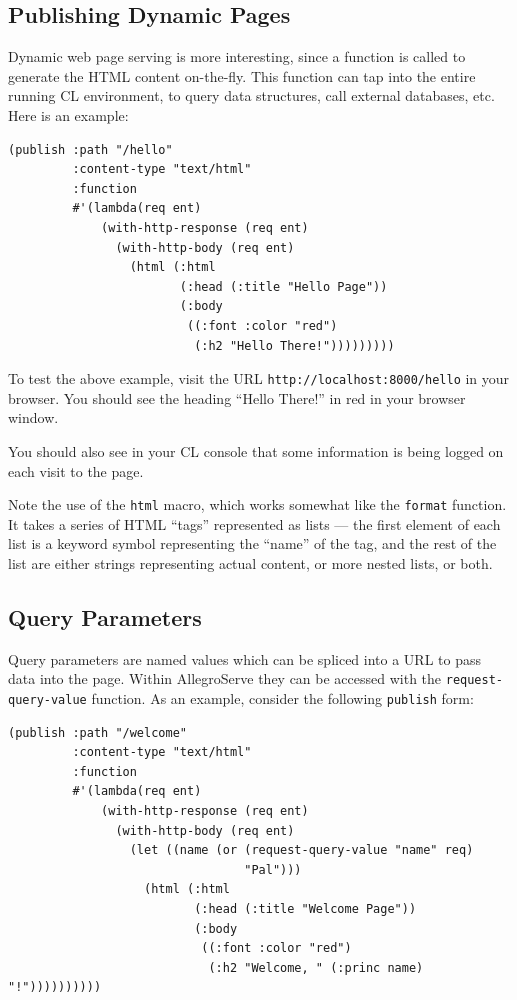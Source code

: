 \subsection{Publishing Dynamic Pages}

Dynamic web page serving is more interesting, since a function is called to generate the
HTML content on-the-fly. This function can tap into the entire running CL environment,
to query data structures, call external databases, etc. Here is an example:

\begin{verbatim}
(publish :path "/hello"
         :content-type "text/html"
         :function
         #'(lambda(req ent)
             (with-http-response (req ent)
               (with-http-body (req ent)
                 (html (:html
                        (:head (:title "Hello Page"))
                        (:body
                         ((:font :color "red")
                          (:h2 "Hello There!")))))))))
\end{verbatim}

To test the above example, visit the URL \texttt{http://localhost:8000/hello} in your browser.
You should see the heading ``Hello There!'' in red in your browser window.

You should also see in your CL console that some information is being logged on each
visit to the page.

Note the use of the \texttt{html} macro, which works somewhat like the \texttt{format} function. It
takes a series of HTML ``tags'' represented as lists --- the first element of each list is a
keyword symbol representing the ``name'' of the tag, and the rest of the list are either
strings representing actual content, or more nested lists, or both.

\subsection{Query Parameters}

Query parameters are named values which can be spliced into a URL to pass data into
the page. Within AllegroServe they can be accessed with the \texttt{request-query-value}
function. As an example, consider the following \texttt{publish} form:

\begin{verbatim}
(publish :path "/welcome"
         :content-type "text/html"
         :function
         #'(lambda(req ent)
             (with-http-response (req ent)
               (with-http-body (req ent)
                 (let ((name (or (request-query-value "name" req)
                                 "Pal")))
                   (html (:html
                          (:head (:title "Welcome Page"))
                          (:body
                           ((:font :color "red")
                            (:h2 "Welcome, " (:princ name) "!"))))))))))
\end{verbatim}

